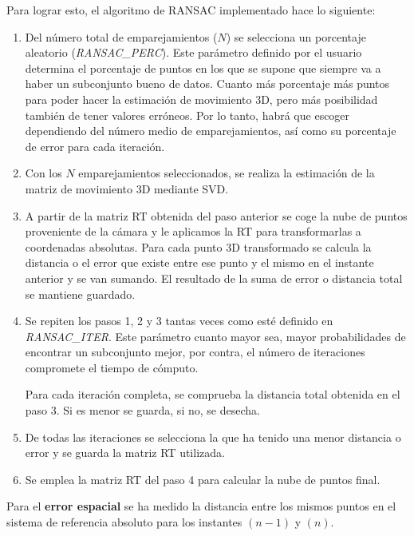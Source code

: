 Para lograr esto, el algoritmo de RANSAC implementado hace lo siguiente:

\begin{enumerate}
\item Del número total de emparejamientos ($N$) se selecciona un porcentaje aleatorio (\textit{RANSAC\_PERC}). Este parámetro definido por el usuario determina el porcentaje de puntos en los que se supone que siempre va a haber un subconjunto bueno de datos. Cuanto más porcentaje más puntos para poder hacer la estimación de movimiento 3D, pero más posibilidad también de tener valores erróneos. Por lo tanto,  habrá que escoger dependiendo del número medio de emparejamientos, así como su porcentaje de error para cada iteración.

\item Con los $N$ emparejamientos seleccionados, se realiza la estimación de la matriz de movimiento 3D mediante SVD.

\item A partir de la matriz RT obtenida del paso anterior se coge la nube de puntos proveniente de la cámara y le aplicamos la RT para transformarlas a coordenadas absolutas. Para cada punto 3D transformado se calcula la distancia o el error que existe entre ese punto y el mismo en el instante anterior y se van sumando. El resultado de la suma de error o distancia total se mantiene guardado.

\item Se repiten los pasos 1, 2 y 3 tantas veces como esté definido en \textit{RANSAC\_ITER}. Este parámetro cuanto mayor sea, mayor probabilidades de encontrar un subconjunto mejor, por contra, el número de iteraciones compromete el tiempo de cómputo.

Para cada iteración completa, se comprueba la distancia total obtenida en el paso 3. Si es menor se guarda, si no, se desecha.
 
\item De todas las iteraciones se selecciona la que ha tenido una menor distancia o error y se guarda la matriz RT utilizada.

\item Se emplea la matriz RT del paso 4 para calcular la nube de puntos final.

\end{enumerate}

Para el \textbf{error espacial} se ha medido la distancia entre los mismos puntos en el sistema de referencia absoluto para los instantes $(n-1)$ y $(n)$. 

